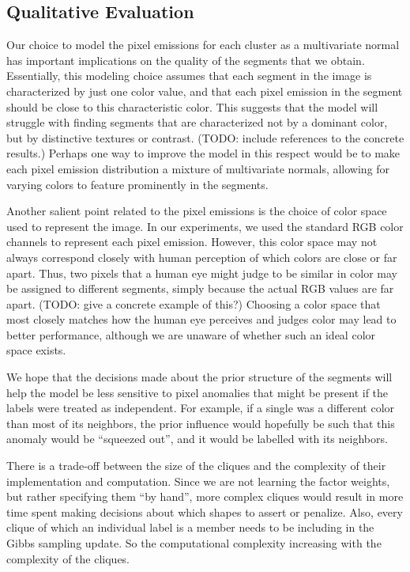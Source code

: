 \documentclass[12pt]{article}
\begin{document}
\subsection*{Qualitative Evaluation}
Our choice to model the pixel emissions for each cluster as a multivariate normal has important
implications on the quality of the segments that we obtain.
Essentially, this modeling choice assumes that each segment in the image is characterized by just one
color value, and that each pixel emission in the segment should be close to this characteristic
color. This suggests that the model will struggle with finding segments that are characterized
not by a dominant color, but by distinctive textures or contrast. (TODO: include references to
the concrete results.) Perhaps one way to improve the model in this respect would be to make each
pixel emission distribution a mixture of multivariate normals, allowing for varying colors to feature
prominently in the segments.

Another salient point related to the pixel emissions is the choice of color space used to represent
the image.
In our experiments, we used the standard RGB color channels to represent each pixel emission.
However, this color space may not always correspond closely with human perception of which colors are
close or far apart.
Thus, two pixels that a human eye might judge to be similar in color may be assigned to different
segments, simply because the actual RGB values are far apart. (TODO: give a concrete example of this?)
Choosing a color space that most closely matches how the human eye perceives and judges color may
lead to better performance, although we are unaware of whether such an ideal color space exists.

We hope that the decisions made about the prior structure of the segments will
help the model be less sensitive to pixel anomalies that might be present if
the labels were treated as independent. For example, if a single was a
different color than most of its neighbors, the prior influence would hopefully
be such that this anomaly would be ``squeezed out'', and it would be labelled
with its neighbors.

There is a trade-off between the size of the cliques and the complexity of their
implementation and computation. Since we are not learning the factor weights,
but rather specifying them ``by hand'', more complex cliques would result in
more time spent making decisions about which shapes to assert or penalize.
Also, every clique of which an individual label is a member needs to be
including in the Gibbs sampling update. So the computational complexity
increasing with the complexity of the cliques.
\end{document}
